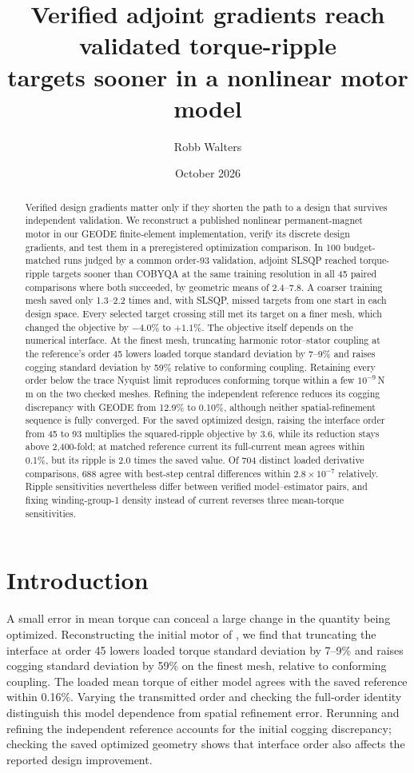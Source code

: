 \documentclass{anvil-paper}
\title{Verified adjoint gradients reach validated torque-ripple\\
targets sooner in a nonlinear motor model}
\author{Robb Walters}
\date{October 2026}
\begin{document}
\maketitle
\begin{abstract}
Verified design gradients matter only if they shorten the path to a design
that survives independent validation. We reconstruct a published nonlinear
permanent-magnet motor in our GEODE finite-element implementation, verify
its discrete design gradients, and test them in a preregistered optimization
comparison. In 100 budget-matched runs judged by a common order-93
validation, adjoint SLSQP reached torque-ripple targets sooner than COBYQA at
the same training resolution in all 45 paired comparisons where both
succeeded, by geometric means of 2.4--7.8. A coarser training mesh saved
only 1.3--2.2 times and, with SLSQP, missed targets from one start in each
design space. Every selected target crossing still met its target on a
finer mesh, which changed the objective by $-4.0\%$ to $+1.1\%$.
The objective itself depends on the numerical interface. At the finest
mesh, truncating harmonic rotor--stator coupling at the reference's order 45
lowers loaded torque standard deviation by 7--9\% and raises cogging
standard deviation by 59\% relative to conforming coupling. Retaining every
order below the trace Nyquist limit reproduces conforming torque within a
few $10^{-9}$\,N\,m on the two checked meshes. Refining the independent reference reduces its cogging
discrepancy with GEODE from 12.9\% to 0.10\%, although neither
spatial-refinement sequence is fully converged. For the saved optimized
design, raising the interface order from 45 to 93 multiplies the
squared-ripple objective by 3.6, while its reduction stays above
2,400-fold; at matched reference current its full-current mean agrees
within 0.1\%, but its ripple is 2.0 times the saved value. Of 704 distinct
loaded derivative comparisons, 688 agree with best-step central
differences within $2.8\times10^{-7}$ relatively. Ripple sensitivities
nevertheless differ between verified model--estimator pairs, and fixing
winding-group-1 density instead of current reverses three mean-torque
sensitivities.
\end{abstract}

\section{Introduction}
A small error in mean torque can conceal a large change in the quantity
being optimized. Reconstructing the initial motor of
\citet{wiesheu2024spline}, we find that truncating the interface at order 45
lowers loaded torque standard deviation by 7--9\% and raises cogging
standard deviation by 59\% on the finest mesh, relative to conforming coupling. The loaded
mean torque of either model agrees with the saved reference within 0.16\%.
Varying the transmitted order and checking the full-order identity
distinguish this model dependence from spatial refinement error. Rerunning
and refining the independent reference accounts for the initial cogging
discrepancy; checking the saved optimized geometry shows that interface
order also affects the reported design improvement.
\end{document}
